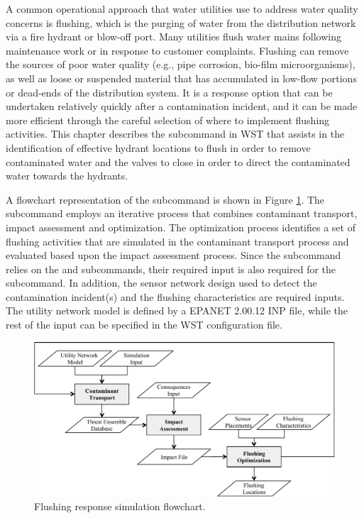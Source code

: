 A common operational approach that water utilities use to address water quality concerns is flushing, which 
is the purging of water from the distribution network via a fire hydrant or blow-off port. 
Many utilities flush water mains following maintenance work 
or in response to customer complaints. Flushing can remove the sources 
of poor water quality (e.g., pipe corrosion, bio-film microorganisms), as well 
as loose or suspended material that has accumulated in low-flow portions or 
dead-ends of the distribution system. It is a response option that can be undertaken 
relatively quickly after a contamination incident, and it can be made more efficient through 
the careful selection of where to implement flushing activities. This chapter describes 
the  subcommand in WST that assists in the identification of effective 
hydrant locations to flush in order to remove contaminated water and the valves to close 
in order to direct the contaminated water towards the hydrants. 

A flowchart representation of the  subcommand is shown in Figure \ref{fig:flushing-flowchart}. 
The  subcommand employs an iterative process that combines contaminant transport, impact assessment 
and optimization. The optimization process identifies a set of flushing activities 
that are simulated in the contaminant transport process and evaluated 
based upon the impact assessment process. Since the  subcommand relies 
on the  and  subcommands, their required input 
is also required for the  subcommand. In addition, the sensor network 
design used to detect the contamination incident(s) and the flushing characteristics 
are required inputs. The utility network model is defined by a EPANET 2.00.12 INP file, 
while the rest of the input can be specified in the  WST configuration file.

\begin{figure}[h]
  \centering
  \includegraphics[scale=0.75]{graphics/flushing_flowchart.pdf}
  \caption{Flushing response simulation flowchart.}
  \label{fig:flushing-flowchart}
\end{figure}

